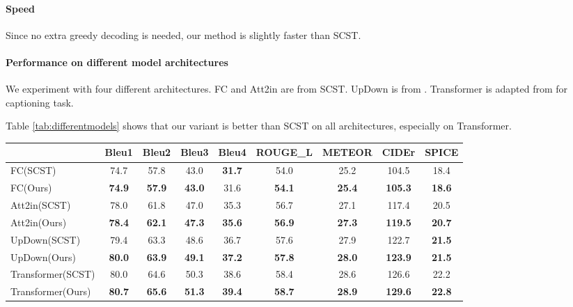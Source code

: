 \documentclass[11pt,a4paper]{article}
\begin{document}
\paragraph{Speed} Since no extra greedy decoding is needed, our method is slightly faster than SCST.
\paragraph{Performance on different model architectures}
We experiment with four different architectures. FC and Att2in are from SCST\cite{rennie2017self}. UpDown is from \cite{anderson2018bottom}. Transformer is adapted from \cite{vaswani2017attention} for captioning task.

Table \ref{tab:differentmodels} shows that our variant is better than SCST on all architectures, especially on Transformer.

\begin{table*}[htbp]\small
  \centering
    \begin{tabular}{lcccccccc}
          & \multicolumn{1}{c}{Bleu1} & \multicolumn{1}{c}{Bleu2} & \multicolumn{1}{c}{Bleu3} & \multicolumn{1}{c}{Bleu4} & \multicolumn{1}{c}{ROUGE\_L} & \multicolumn{1}{c}{METEOR} & \multicolumn{1}{c}{CIDEr} & \multicolumn{1}{c}{SPICE} \\
    \hline
    FC(SCST) & 74.7  & 57.8  & 43.0  & \textbf{31.7} & 54.0  & 25.2  & 104.5 & 18.4 \\
    FC(Ours) & \textbf{74.9} & \textbf{57.9} & \textbf{43.0} & 31.6  & \textbf{54.1} & \textbf{25.4} & \textbf{105.3} & \textbf{18.6} \\
    \hline
    Att2in(SCST) & 78.0  & 61.8  & 47.0  & 35.3  & 56.7  & 27.1  & 117.4 & 20.5 \\
    Att2in(Ours) & \textbf{78.4} & \textbf{62.1} & \textbf{47.3} & \textbf{35.6} & \textbf{56.9} & \textbf{27.3} & \textbf{119.5} & \textbf{20.7} \\
    \hline
    UpDown(SCST) & 79.4  & 63.3  & 48.6  & 36.7  & 57.6  & 27.9  & 122.7 & \textbf{21.5} \\
    UpDown(Ours) & \textbf{80.0} & \textbf{63.9} & \textbf{49.1} & \textbf{37.2} & \textbf{57.8} & \textbf{28.0} & \textbf{123.9} & \textbf{21.5} \\
    \hline
    Transformer(SCST) & 80.0  & 64.6  & 50.3  & 38.6  & 58.4  & 28.6  & 126.6 & 22.2 \\
    Transformer(Ours) & \textbf{80.7} & \textbf{65.6} & \textbf{51.3} & \textbf{39.4} & \textbf{58.7} & \textbf{28.9} & \textbf{129.6} & \textbf{22.8} \\
    \hline
    \end{tabular}\caption{The performance of our method on different model architectures. The numbers are from authors' own implementation.}
  \label{tab:differentmodels}\end{table*}
\end{document}
